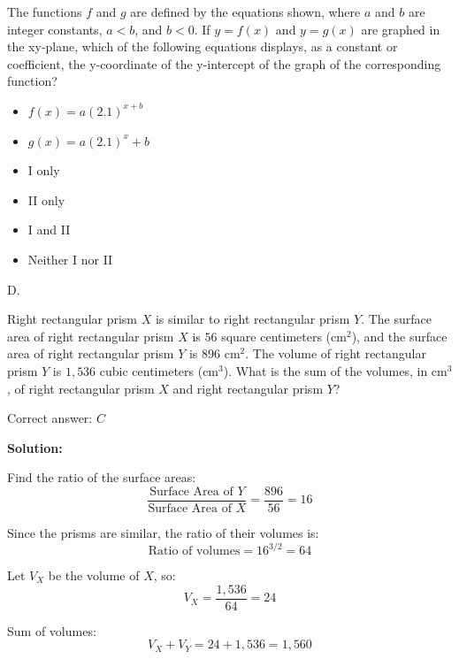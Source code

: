 \documentclass{article}
\begin{document}
\begin{tcolorbox}[colback=blue!10, colframe=blue!50!black, title=Question 20]
The functions \( f \) and \( g \) are defined by the equations shown, where \( a \) and \( b \) are integer constants, \( a < b \), and \( b < 0 \). If \( y = f(x) \) and \( y = g(x) \) are graphed in the xy-plane, which of the following equations displays, as a constant or coefficient, the y-coordinate of the y-intercept of the graph of the corresponding function?

\begin{itemize}
    \item[I.] \( f(x) = a(2.1)^{x+b} \)
    \item[II.] \( g(x) = a(2.1)^x + b \)
\end{itemize}

\begin{itemize}
    \item[A.] I only
    \item[B.] II only
    \item[C.] I and II 
    \item[D.] Neither I nor II
\end{itemize}
\end{tcolorbox}

\begin{tcolorbox}[colback=green!5!white, colframe=green!75!black, title=Solution]
D.
\end{tcolorbox}

\newpage
\begin{tcolorbox}[colback=blue!5!white, colframe=blue!75!black, title=Question 21]
Right rectangular prism \(X\) is similar to right rectangular prism \(Y\).
The surface area of right rectangular prism \(X\) is \(56\) square centimeters (\(\text{cm}^2\)), and the surface area of right rectangular prism \(Y\) is \(896\) \(\text{cm}^2\).
The volume of right rectangular prism \(Y\) is \(1,536\) cubic centimeters (\(\text{cm}^3\)).
What is the sum of the volumes, in \(\text{cm}^3\), of right rectangular prism \(X\) and right rectangular prism \(Y\)?

\end{tcolorbox}

\begin{tcolorbox}[colback=green!10, colframe=green!50!black, title=Answer]
Correct answer: \(C\)

\textbf{Solution:} 

Find the ratio of the surface areas:
\[
\frac{\text{Surface Area of } Y}{\text{Surface Area of } X} = \frac{896}{56} = 16
\]

Since the prisms are similar, the ratio of their volumes is:
\[
\text{Ratio of volumes} = 16^{3/2} = 64
\]

Let \(V_X\) be the volume of \(X\), so:
\[
V_X = \frac{1,536}{64} = 24
\]

Sum of volumes:
\[
V_X + V_Y = 24 + 1,536 = 1,560
\]
\end{tcolorbox}
\end{document}
